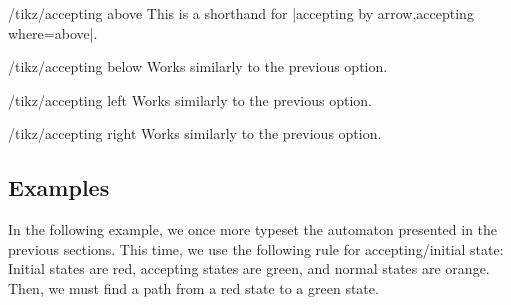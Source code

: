 \begin{stylekey}{/tikz/accepting above}
    This is a shorthand for |accepting by arrow,accepting where=above|.
\end{stylekey}

\begin{stylekey}{/tikz/accepting below}
    Works similarly to the previous option.
\end{stylekey}

\begin{stylekey}{/tikz/accepting left}
    Works similarly to the previous option.
\end{stylekey}

\begin{stylekey}{/tikz/accepting right}
    Works similarly to the previous option.
\end{stylekey}


\subsection{Examples}

In the following example, we once more typeset the automaton presented in the
previous sections. This time, we use the following rule for accepting/initial
state: Initial states are red, accepting states are green, and normal states
are orange. Then, we must find a path from a red state to a green state.
%
\begin{codeexample}[preamble={\usetikzlibrary{arrows.meta,automata,positioning,shadows}}]
\end{codeexample}

